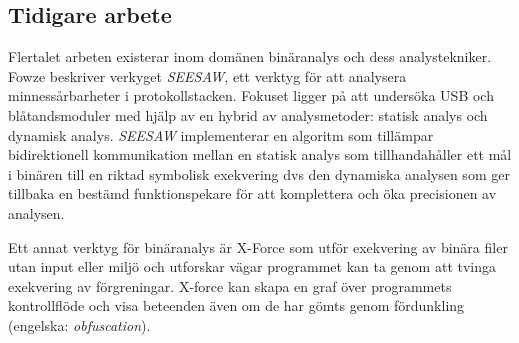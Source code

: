 \subsection{Tidigare arbete}
Flertalet arbeten existerar inom domänen binäranalys och dess analystekniker. Fowze \cite{fowze_mem_vul}
beskriver verkyget \emph{SEESAW}, ett verktyg för att analysera
minnessårbarheter i protokollstacken. Fokuset ligger på att undersöka USB och
blåtandsmoduler med hjälp av en hybrid av analysmetoder: statisk analys och
dynamisk analys. \emph{SEESAW} implementerar en algoritm som tillämpar
bidirektionell kommunikation mellan en statisk analys som tillhandahåller ett
mål i binären till en riktad symbolisk exekvering dvs den dynamiska analysen som
ger tillbaka en bestämd funktionspekare för att komplettera och öka precisionen
av analysen.  

Ett annat verktyg för binäranalys är X-Force som utför exekvering av binära 
filer utan input eller miljö och utforskar vägar programmet kan ta genom att 
tvinga exekvering av förgreningar\cite{xforce}. X-force kan skapa en graf över 
programmets kontrollflöde och visa beteenden även om de har gömts genom
fördunkling (engelska: \emph{obfuscation}).
